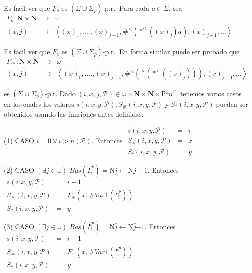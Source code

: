 Es facil ver que \(F_{0}\) es \((\Sigma \cup \Sigma _{p})\)-p.r.. Para cada \( a\in \Sigma \), sea
\(\displaystyle \begin{array}{rll} F_{a}:\mathbf{N}\times \mathbf{N} & \rightarrow & \omega \\ (x,j) & \rightarrow & \left\langle (x)_{1},....,(x)_{j-1},\#^{< }(\ast ^{< }((x)_{j})a),(x)_{j+1},...\right\rangle \end{array} \)

Es facil ver que \(F_{a}\) es \((\Sigma \cup \Sigma _{p})\)-p.r.. En forma similar puede ser probado que
\(\displaystyle \begin{array}{rll} F_{\curvearrowright }:\mathbf{N}\times \mathbf{N} & \rightarrow & \omega \\ (x,j) & \rightarrow & \left\langle (x)_{1},....,(x)_{j-1},\#^{< }(^{\curvearrowright }(\ast ^{< }((x)_{j}))),(x)_{j+1},...\right\rangle \end{array} \)

es \((\Sigma \cup \Sigma _{p})\)-p.r.
Dado \((i,x,y,\mathcal{P})\in \omega \times \mathbf{N}\times \mathbf{N}\times \mathrm{Pro}^{\Sigma }\), tenemos varios casos en los cuales los valores \( s(i,x,y,\mathcal{P}),S_{\#}(i,x,y,\mathcal{P})\) y \(S_{\ast }(i,x,y,\mathcal{P })\) pueden ser obtenidos usando las funciones antes definidas:

(1) CASO \(i=0\vee i >n(\mathcal{P})\). Entonces
\(\displaystyle \begin{array}{rcl} s(i,x,y,\mathcal{P}) & =& i \\ S_{\#}(i,x,y,\mathcal{P}) & =& x \\ S_{\ast }(i,x,y,\mathcal{P}) & =& y \end{array} \)

(2) CASO \((\exists j\in \omega )\;Bas(I_{i}^{\mathcal{P}})=\mathrm{N} \bar{j}\leftarrow \mathrm{N}\bar{j}+1\). Entonces
\(\displaystyle \begin{array}{rcl} s(i,x,y,\mathcal{P}) & =& i+1 \\ S_{\#}(i,x,y,\mathcal{P}) & =& F_{+}(x,\#Var1(I_{i}^{\mathcal{P}})) \\ S_{\ast }(i,x,y,\mathcal{P}) & =& y \end{array} \)

(3) CASO \((\exists j\in \omega )\;Bas(I_{i}^{\mathcal{P}})=\mathrm{N} \bar{j}\leftarrow \mathrm{N}\bar{j}\dot{-}1\). Entonces
\(\displaystyle \begin{array}{rcl} s(i,x,y,\mathcal{P}) & =& i+1 \\ S_{\#}(i,x,y,\mathcal{P}) & =& F_{\dot{-}}(x,\#Var1(I_{i}^{\mathcal{P}})) \\ S_{\ast }(i,x,y,\mathcal{P}) & =& y \end{array} \)

